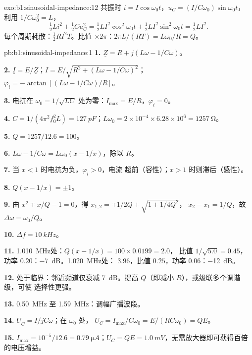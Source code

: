 \begin{solution}{exo:b1:sinusoidal-impedance:12}
共振时 $i = I\cos\omega_0 t$，$u_C = (I/C\omega_0)\sin\omega_0 t$，
利用 $1/C\omega_0^2 = L$，
\[
\tfrac12 Li^2 + \tfrac12 Cu_C^2 = \tfrac12 LI^2\cos^2\omega_0 t
+ \tfrac12 LI^2\sin^2\omega_0 t = \tfrac12 LI^2 .
\]
每个周期耗散：$\tfrac12 RI^2T$。比值 $\times 2\pi$：$2\pi L/(RT)
= L\omega_0/R = Q$。
\end{solution}

\begin{solution}{pb:b1:sinusoidal-impedance:1}
\textbf{1.} $\underline Z = R + j(L\omega - 1/C\omega)$。

\textbf{2.} $\underline I = E/\underline Z$；$I = E/\sqrt{R^2 + (L\omega -
1/C\omega)^2}$；$\varphi_i = -\arctan[(L\omega - 1/C\omega)/R]$。

\textbf{3.} 电抗在 $\omega_0 = 1/\sqrt{LC}$ 处为零：$I_{\max}
= E/R$，$\varphi_i = 0$。

\textbf{4.} $C = 1/(4\pi^2f_0^2L) = \qty{127}{pF}$；$L\omega_0 = 2\times10^{-4}
\times 6.28\times10^6 = \qty{1257}{\ohm}$。

\textbf{5.} $Q = 1257/12.6 = 100$。

\textbf{6.} $L\omega - 1/C\omega = L\omega_0(x - 1/x)$，除以 $R$。

\textbf{7.} 当 $x < 1$ 时电抗为负，$\varphi_i > 0$，电流
超前（容性）；$x > 1$ 时则滞后（感性）。

\textbf{8.} $Q(x - 1/x) = \pm1$。

\textbf{9.} 由 $x^2 \mp x/Q - 1 = 0$，得 $x_{1,2} = \mp1/2Q + \sqrt{1 + 1/4Q^2}$，
$x_2 - x_1 = 1/Q$，故 $\Delta\omega = \omega_0/Q$。

\textbf{10.} $\Delta f = \qty{10}{kHz}$。

\textbf{11.} \qty{1.010}{MHz}处：$Q(x - 1/x) = 100 \times 0.0199 = 2.0$，
比值 $1/\sqrt{5.0} = 0.45$，功率 $0.20$：\qty{-7}{dB}。\qty{1.020}{MHz}处：
$3.96$，比值 $0.25$，功率 $0.06$：\qty{-12}{dB}。

\textbf{12.} 处于临界：邻近频道仅衰减 \qty{7}{dB}。提高
$Q$（即减小 $R$），或级联多个调谐级，可使
选择性更强。

\textbf{13.} \qty{0.50}{MHz} 至 \qty{1.59}{MHz}：调幅广播波段。

\textbf{14.} $\underline U_C = \underline I/jC\omega$；在 $\omega_0$ 处，
$U_C = I_{\max}/C\omega_0 = E/(RC\omega_0) = QE$。

\textbf{15.} $I_{\max} = 10^{-5}/12.6 = \qty{0.79}{\micro A}$；$U_C = QE =
\qty{1.0}{mV}$，无需放大器即可获得百倍的电压增益。


\end{solution}
